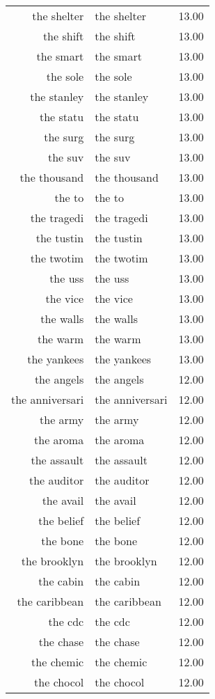 \begin{table}[ht]
\begin{tabular}{rlr}
  the shelter & the shelter & 13.00 \\ 
  the shift & the shift & 13.00 \\ 
  the smart & the smart & 13.00 \\ 
  the sole & the sole & 13.00 \\ 
  the stanley & the stanley & 13.00 \\ 
  the statu & the statu & 13.00 \\ 
  the surg & the surg & 13.00 \\ 
  the suv & the suv & 13.00 \\ 
  the thousand & the thousand & 13.00 \\ 
  the to & the to & 13.00 \\ 
  the tragedi & the tragedi & 13.00 \\ 
  the tustin & the tustin & 13.00 \\ 
  the twotim & the twotim & 13.00 \\ 
  the uss & the uss & 13.00 \\ 
  the vice & the vice & 13.00 \\ 
  the walls & the walls & 13.00 \\ 
  the warm & the warm & 13.00 \\ 
  the yankees & the yankees & 13.00 \\ 
  the angels & the angels & 12.00 \\ 
  the anniversari & the anniversari & 12.00 \\ 
  the army & the army & 12.00 \\ 
  the aroma & the aroma & 12.00 \\ 
  the assault & the assault & 12.00 \\ 
  the auditor & the auditor & 12.00 \\ 
  the avail & the avail & 12.00 \\ 
  the belief & the belief & 12.00 \\ 
  the bone & the bone & 12.00 \\ 
  the brooklyn & the brooklyn & 12.00 \\ 
  the cabin & the cabin & 12.00 \\ 
  the caribbean & the caribbean & 12.00 \\ 
  the cdc & the cdc & 12.00 \\ 
  the chase & the chase & 12.00 \\ 
  the chemic & the chemic & 12.00 \\ 
  the chocol & the chocol & 12.00 \\ 

\end{tabular}
\end{table}
